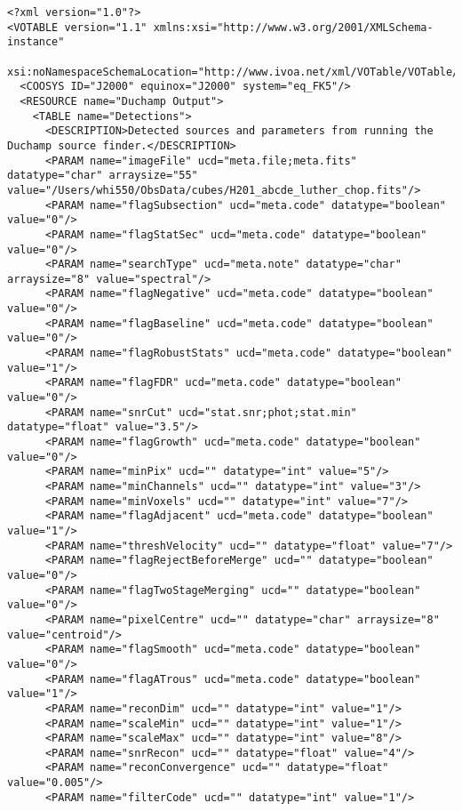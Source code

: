 {\tiny
  \begin{verbatim}
<?xml version="1.0"?>
<VOTABLE version="1.1" xmlns:xsi="http://www.w3.org/2001/XMLSchema-instance"
 xsi:noNamespaceSchemaLocation="http://www.ivoa.net/xml/VOTable/VOTable/v1.1">
  <COOSYS ID="J2000" equinox="J2000" system="eq_FK5"/>
  <RESOURCE name="Duchamp Output">
    <TABLE name="Detections">
      <DESCRIPTION>Detected sources and parameters from running the Duchamp source finder.</DESCRIPTION>
      <PARAM name="imageFile" ucd="meta.file;meta.fits" datatype="char" arraysize="55" value="/Users/whi550/ObsData/cubes/H201_abcde_luther_chop.fits"/>
      <PARAM name="flagSubsection" ucd="meta.code" datatype="boolean" value="0"/>
      <PARAM name="flagStatSec" ucd="meta.code" datatype="boolean" value="0"/>
      <PARAM name="searchType" ucd="meta.note" datatype="char" arraysize="8" value="spectral"/>
      <PARAM name="flagNegative" ucd="meta.code" datatype="boolean" value="0"/>
      <PARAM name="flagBaseline" ucd="meta.code" datatype="boolean" value="0"/>
      <PARAM name="flagRobustStats" ucd="meta.code" datatype="boolean" value="1"/>
      <PARAM name="flagFDR" ucd="meta.code" datatype="boolean" value="0"/>
      <PARAM name="snrCut" ucd="stat.snr;phot;stat.min" datatype="float" value="3.5"/>
      <PARAM name="flagGrowth" ucd="meta.code" datatype="boolean" value="0"/>
      <PARAM name="minPix" ucd="" datatype="int" value="5"/>
      <PARAM name="minChannels" ucd="" datatype="int" value="3"/>
      <PARAM name="minVoxels" ucd="" datatype="int" value="7"/>
      <PARAM name="flagAdjacent" ucd="meta.code" datatype="boolean" value="1"/>
      <PARAM name="threshVelocity" ucd="" datatype="float" value="7"/>
      <PARAM name="flagRejectBeforeMerge" ucd="" datatype="boolean" value="0"/>
      <PARAM name="flagTwoStageMerging" ucd="" datatype="boolean" value="0"/>
      <PARAM name="pixelCentre" ucd="" datatype="char" arraysize="8" value="centroid"/>
      <PARAM name="flagSmooth" ucd="meta.code" datatype="boolean" value="0"/>
      <PARAM name="flagATrous" ucd="meta.code" datatype="boolean" value="1"/>
      <PARAM name="reconDim" ucd="" datatype="int" value="1"/>
      <PARAM name="scaleMin" ucd="" datatype="int" value="1"/>
      <PARAM name="scaleMax" ucd="" datatype="int" value="8"/>
      <PARAM name="snrRecon" ucd="" datatype="float" value="4"/>
      <PARAM name="reconConvergence" ucd="" datatype="float" value="0.005"/>
      <PARAM name="filterCode" ucd="" datatype="int" value="1"/>

\end{verbatim}}
